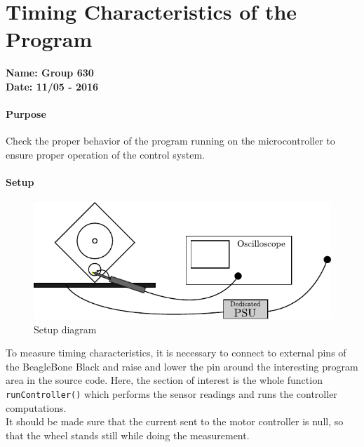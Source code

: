\chapter{Timing Characteristics of the Program}\label{ConnectingBreakoutBoard} 
\textbf{Name: Group 630}\\
\textbf{Date: 11/05 - 2016}

\subsubsection{Purpose}
Check the proper behavior of the program running on the microcontroller to ensure proper operation of the control system.

\subsubsection{Setup}
\begin{figure}[H]
  \centering
  \includegraphics[scale=1]{figures/LabSetupRangeTest.pdf}
  \caption{Setup diagram}
  \label{LabSetupRangeTest}
\end{figure}
To measure timing characteristics, it is necessary to connect to external pins of the BeagleBone Black and raise and lower the pin around the interesting program area in the source code. Here, the section of interest is the whole function \lstinline{runController()} which performs the sensor readings and runs the controller computations.\\
It should be made sure that the current sent to the motor controller is null, so that the wheel stands still while doing the measurement.

